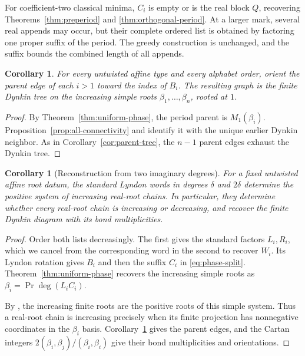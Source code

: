 \documentclass[11pt]{amsart}
\numberwithin{equation}{section}
\newtheorem{corollary}[theorem]{Corollary}
\theoremstyle{definition}
\DeclareMathOperator{\Prj}{Pr}
\begin{document}
For coefficient-two classical minima, $C_i$ is empty or is the real block $Q$, recovering Theorems~\ref{thm:preperiod} and \ref{thm:orthogonal-period}. At a larger mark, several real appends may occur, but their complete ordered list is obtained by factoring one proper suffix of the period. The greedy construction is unchanged, and the suffix bounds the combined length of all appends.

\begin{corollary}\label{cor:all-parent-tree}
For every untwisted affine type and every alphabet order, orient the parent edge of each $i>1$ toward the index of $B_i$. The resulting graph is the finite Dynkin tree on the increasing simple roots $\beta_1,\ldots,\beta_n$, rooted at $1$.
\end{corollary}
\begin{proof}
By Theorem~\ref{thm:uniform-phase}, the period parent is $M_1(\beta_i)$. Proposition~\ref{prop:all-connectivity} and \cite[Lemma~4.32]{ETC} identify it with the unique earlier Dynkin neighbor. As in Corollary~\ref{cor:parent-tree}, the $n-1$ parent edges exhaust the Dynkin tree.
\end{proof}

\begin{corollary}[Reconstruction from two imaginary degrees]\label{cor:two-degree-reconstruction}
For a fixed untwisted affine root datum, the standard Lyndon words in degrees $\delta$ and $2\delta$ determine the positive system of increasing real-root chains. In particular, they determine whether every real-root chain is increasing or decreasing, and recover the finite Dynkin diagram with its bond multiplicities.
\end{corollary}
\begin{proof}
Order both lists decreasingly. The first gives the standard factors $L_i,R_i$, which we cancel from the corresponding word in the second to recover $W_i$. Its Lyndon rotation gives $B_i$ and then the suffix $C_i$ in \eqref{eq:phase-split}. Theorem~\ref{thm:uniform-phase} recovers the increasing simple roots as $\beta_i=\Prj\deg(L_iC_i)$.

By \cite[Section~4]{ETC}, the increasing finite roots are the positive roots of this simple system. Thus a real-root chain is increasing precisely when its finite projection has nonnegative coordinates in the $\beta_i$ basis. Corollary~\ref{cor:all-parent-tree} gives the parent edges, and the Cartan integers $2(\beta_i,\beta_j)/(\beta_i,\beta_i)$ give their bond multiplicities and orientations.
\end{proof}
\end{document}
